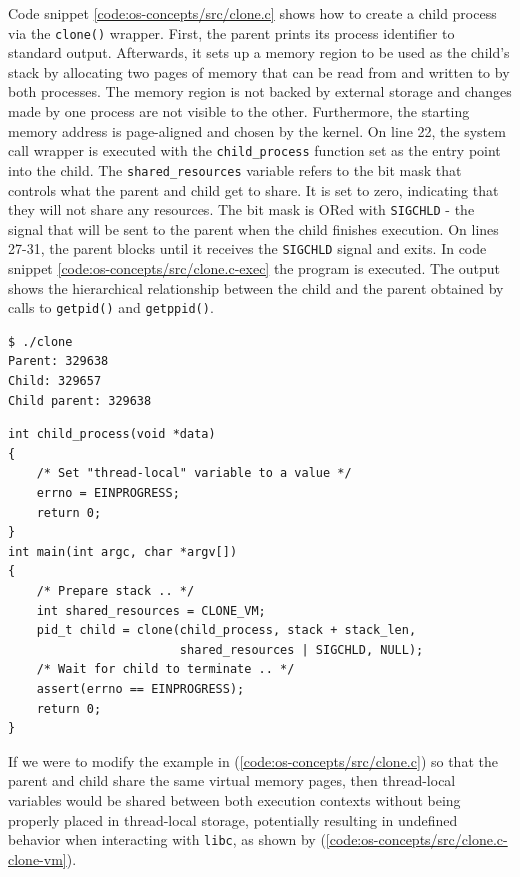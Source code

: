 Code snippet \ref{code:os-concepts/src/clone.c} shows how to create a child process via 
the \verb|clone()| wrapper. First, the parent prints its process identifier to standard output. 
Afterwards, it sets up a memory region to be used as the child's stack by allocating 
two pages of memory that can be read from and written to by both processes.
The memory region is not backed by external storage and changes made by one process are not visible to the other.
Furthermore, the starting memory address is page-aligned and chosen by the kernel.
On line 22, the system call wrapper is executed with the \verb|child_process| function set as the entry point into the child. 
The \verb|shared_resources| variable refers to the 
bit mask that controls what the parent and child get to share. It is set to zero, indicating that 
they will not share any resources. The bit mask is ORed with \verb|SIGCHLD| - the signal 
that will be sent to the parent when the child finishes execution. On lines 27-31, the 
parent blocks until it receives the \verb|SIGCHLD| signal and exits.
In code snippet \ref{code:os-concepts/src/clone.c-exec} the program is executed. The output shows the 
hierarchical relationship between the child and the parent obtained by calls to \verb|getpid()| and 
\verb|getppid()|. 
\begin{lstlisting}[label={code:os-concepts/src/clone.c-exec}, style=bash, caption={os-concepts/src/clone.c output}]
$ ./clone 
Parent: 329638
Child: 329657
Child parent: 329638
\end{lstlisting}
\begin{lstlisting}[label={code:os-concepts/src/clone.c-clone-vm}, style=c-code-snippets, caption={Clone with virtual memory sharing}]
int child_process(void *data)
{
    /* Set "thread-local" variable to a value */
    errno = EINPROGRESS;
    return 0;
}
int main(int argc, char *argv[])
{
    /* Prepare stack .. */
    int shared_resources = CLONE_VM;
    pid_t child = clone(child_process, stack + stack_len,
                        shared_resources | SIGCHLD, NULL);
    /* Wait for child to terminate .. */
    assert(errno == EINPROGRESS);
    return 0;
}
\end{lstlisting}
If we were to modify the example in (\ref{code:os-concepts/src/clone.c}) so that the parent and child share the same virtual memory pages,
then thread-local variables would be shared between both execution contexts without being properly 
placed in thread-local storage,  potentially 
resulting in undefined behavior when interacting with \verb|libc|, as shown by (\ref{code:os-concepts/src/clone.c-clone-vm}).
